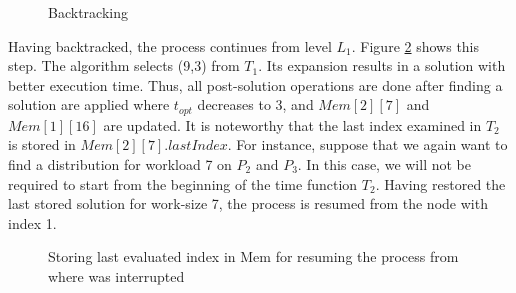 \documentclass[12pt]{article}
\begin{document}
\begin{figure}[!t]
	\centering
	\caption{Backtracking}
	\label{ex_fig5}
\end{figure}

Having backtracked, the process continues from level $L_1$. Figure \ref{ex_fig6} shows this step. The algorithm selects (9,3) from $T_1$. Its expansion results in a solution with better execution time. Thus, all post-solution operations are done after finding a solution are applied where $t_{opt}$ decreases to 3, and $Mem[2][7]$ and $Mem[1][16]$ are updated. It is noteworthy that the last index examined in $T_2$ is stored in $Mem[2][7].lastIndex$. For instance, suppose that we again want to find a distribution for workload 7 on $P_2$ and $P_3$. In this case, we will not be required to start from the beginning of the time function $T_2$. Having restored the last stored solution for work-size 7, the process is resumed from the node with index 1.

\begin{figure}[!t]
	\centering
	\caption{Storing last evaluated index in Mem for resuming the process from where was interrupted}
	\label{ex_fig6}
\end{figure}
\end{document}
